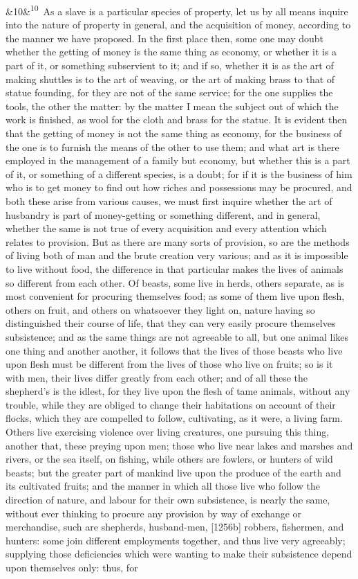 \documentclass[12pt]{article}
\newcommand{\para}[1][]{\par\noindent\ifx&#1&\else\textsuperscript{\footnotesize #1}~\fi}
\begin{document}
\para[10] [1256a] As a slave is a particular species of property, let us by all means inquire into the nature of property in general, and the acquisition of money, according to the manner we have proposed. In the first place then, some one may doubt whether the getting of money is the same thing as economy, or whether it is a part of it, or something subservient to it; and if so, whether it is as the art of making shuttles is to the art of weaving, or the art of making brass to that of statue founding, for they are not of the same service; for the one supplies the tools, the other the matter: by the matter I mean the subject out of which the work is finished, as wool for the cloth and brass for the statue. It is evident then that the getting of money is not the same thing as economy, for the business of the one is to furnish the means of the other to use them; and what art is there employed in the management of a family but economy, but whether this is a part of it, or something of a different species, is a doubt; for if it is the business of him who is to get money to find out how riches and possessions may be procured, and both these arise from various causes, we must first inquire whether the art of husbandry is part of money-getting or something different, and in general, whether the same is not true of every acquisition and every attention which relates to provision. But as there are many sorts of provision, so are the methods of living both of man and the brute creation very various; and as it is impossible to live without food, the difference in that particular makes the lives of animals so different from each other. Of beasts, some live in herds, others separate, as is most convenient for procuring themselves food; as some of them live upon flesh, others on fruit, and others on whatsoever they light on, nature having so distinguished their course of life, that they can very easily procure themselves subsistence; and as the same things are not agreeable to all, but one animal likes one thing and another another, it follows that the lives of those beasts who live upon flesh must be different from the lives of those who live on fruits; so is it with men, their lives differ greatly from each other; and of all these the shepherd's is the idlest, for they live upon the flesh of tame animals, without any trouble, while they are obliged to change their habitations on account of their flocks, which they are compelled to follow, cultivating, as it were, a living farm. Others live exercising violence over living creatures, one pursuing this thing, another that, these preying upon men; those who live near lakes and marshes and rivers, or the sea itself, on fishing, while others are fowlers, or hunters of wild beasts; but the greater part of mankind live upon the produce of the earth and its cultivated fruits; and the manner in which all those live who follow the direction of nature, and labour for their own subsistence, is nearly the same, without ever thinking to procure any provision by way of exchange or merchandise, such are shepherds, husband-men, [1256b] robbers, fishermen, and hunters: some join different employments together, and thus live very agreeably; supplying those deficiencies which were wanting to make their subsistence depend upon themselves only: thus, for 
\end{document}
